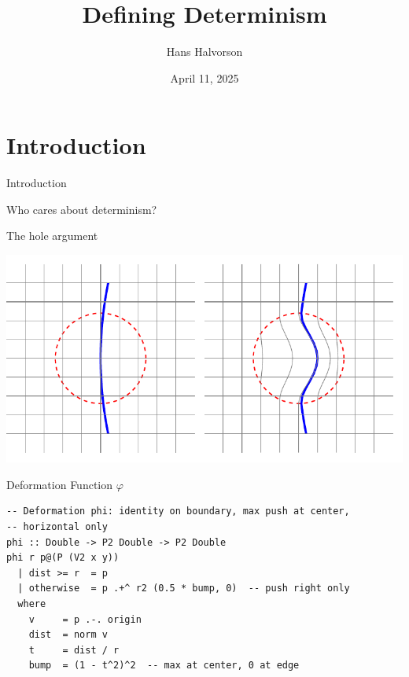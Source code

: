\documentclass[fleqn]{beamer}
\title{Defining Determinism}
\subtitle{}
\author{Hans Halvorson}
\institute{Princeton University}
\date{April 11, 2025}
\begin{document}
\begin{frame}
   \titlepage
\end{frame}

\section{Introduction}

\begin{frame}{Introduction}


  {\Huge
    Who cares about determinism? }


\end{frame}

\begin{frame}{The hole argument}

  \includegraphics[scale=0.8]{hole.pdf}


\end{frame}

\begin{frame}[fragile]{Deformation Function $\varphi$}
\begin{verbatim}
-- Deformation phi: identity on boundary, max push at center,
-- horizontal only
phi :: Double -> P2 Double -> P2 Double
phi r p@(P (V2 x y))
  | dist >= r  = p
  | otherwise  = p .+^ r2 (0.5 * bump, 0)  -- push right only
  where
    v     = p .-. origin
    dist  = norm v
    t     = dist / r
    bump  = (1 - t^2)^2  -- max at center, 0 at edge
\end{verbatim}
\end{frame}
\end{document}
